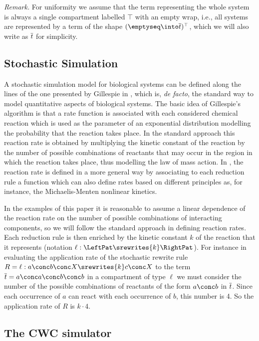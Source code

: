 \noindent \emph{Remark.} For  uniformity we assume that the term representing the whole
system is always a single compartment labelled $\top$ with an empty wrap, i.e., all systems are represented by a term of the shape
$\wr{\emptyseq}{\ov{t}}{\top}$, which we will also write as $\overline{t}$ for simplicity.


\subsection{Stochastic Simulation}\label{SECT:STO_SEM}

A stochastic simulation model for biological systems can be defined
along the lines of the one
presented by Gillespie in \cite{G77}, which is, \emph{de facto}, the standard way to model quantitative aspects of biological systems. The basic idea of
Gillespie's algorithm is that a rate function is associated with each considered chemical reaction which is used as the parameter of an exponential distribution modelling the probability that the reaction takes place. In the standard approach this reaction rate is obtained by multiplying the kinetic
constant of the reaction by the number of possible combinations of reactants that may occur in the region in which the reaction takes place, thus modelling the law of mass action. In \cite{preQAPL2010}, the reaction rate is defined in a more general way by associating to each reduction rule a function which can also define rates based on different principles as, for instance, the Michaelis-Menten nonlinear kinetics.

In the examples of this paper it is reasonable to assume a linear dependence of the reaction rate on the number of possible combinations of interacting components, so we will follow the standard approach in defining reaction rates. Each reduction rule is then enriched by the kinetic constant $k$ of the reaction that it represents (notation $\ell:\LeftPat \srewrites{k} \RightPat $).
For instance in evaluating the application rate of the stochastic rewrite rule $R=
\ell: a \conc b \conc X \srewrites{k} c \conc X$ to the term $\ov{t}=a\conc a \conc b \conc b$ in a compartment of type $\ell$ we must consider the number of the possible combinations of reactants of
the form $a\conc b$ in $\overline{t}$. Since each occurrence of $a$ can react with each occurrence of $b$, this number is 4. So the application rate of $R$ is
$k\cdot 4$.





\subsection{The CWC simulator}
\label{sec:simulator}


